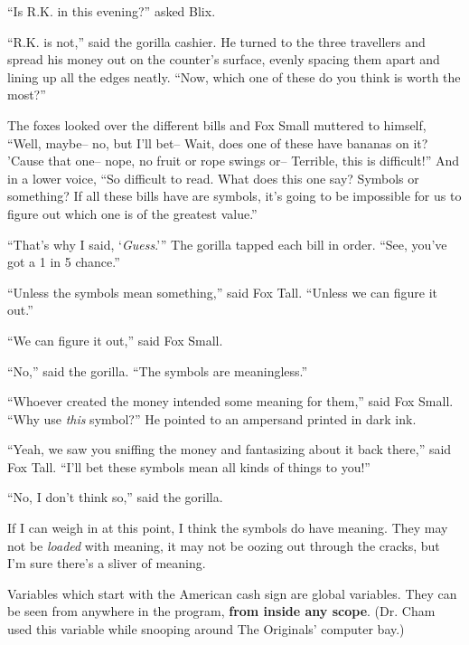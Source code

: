 \documentclass[12pt,twoside]{report}
\begin{document}
``Is R.K. in this evening?'' asked Blix.

``R.K. is not,'' said the gorilla cashier.  He turned to the three
        travellers and spread his money out on the counter's surface,
        evenly spacing them apart and lining up all the edges neatly.
        ``Now, which one of these do you think is worth the most?''

The foxes looked over the different bills and Fox Small muttered to
himself, ``Well, maybe-- no, but I'll bet-- Wait, does one of these
have bananas on it?  'Cause that one-- nope, no fruit or rope swings
or-- Terrible, this is difficult!''  And in a lower voice, ``So
difficult to read.  What does this one say?  Symbols or something? If
all these bills have are symbols, it's going to be impossible for us
to figure out which one is of the greatest value.''

``That's why I said, `{\em Guess}.'''  The gorilla tapped each bill in
order.  ``See, you've got a 1 in 5 chance.''

``Unless the symbols mean something,'' said Fox Tall.  ``Unless we can
figure it out.''

``We can figure it out,'' said Fox Small.

``No,'' said the gorilla.  ``The symbols are meaningless.''

``Whoever created the money intended some meaning for them,'' said Fox
Small.  ``Why use {\em this} symbol?''  He pointed to an ampersand
printed in dark ink.

``Yeah, we saw you sniffing the money and fantasizing about it back
there,'' said Fox Tall.  ``I'll bet these symbols mean all kinds of
things to you!''

``No, I don't think so,'' said the gorilla.

If I can weigh in at this point, I think the symbols do have meaning.
They may not be {\em loaded} with meaning, it may not be oozing out
through the cracks, but I'm sure there's a sliver of meaning.




Variables which start with the American cash sign are global
variables.  They can be seen from anywhere in the program, {\bf from
  inside any scope}.  (Dr. Cham used this variable while snooping
around The Originals' computer bay.)
\end{document}
